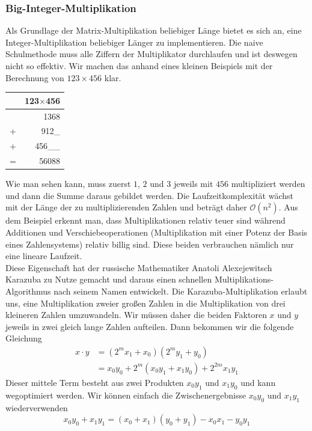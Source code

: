 \documentclass[course=erap]{aspdoc}
\begin{document}
\subsubsection{Big-Integer-Multiplikation}
Als Grundlage der Matrix-Multiplikation beliebiger Länge bietet es sich an, eine Integer-Multiplikation beliebiger Länger zu implementieren. Die naive Schulmethode muss alle Ziffern der Multiplikator durchlaufen und ist deswegen nicht so effektiv. Wir machen das anhand eines kleinen Beispiels mit der Berechnung von $123\times456$ klar.  
\begin{center}
    \begin{tabular}{lr}
    &123$\times$456 \\
    \hline
    &1368 \\
    +&912\_ \\
    +&456\_\_ \\
    \hline
    =&56088 \\
    \end{tabular}
\end{center}
Wie man sehen kann, muss zuerst $1$, $2$ und $3$ jeweils mit $456$ multipliziert werden und dann die Summe daraus gebildet werden. Die Laufzeitkomplexität wächst mit der Länge der zu multiplizierenden Zahlen und beträgt daher $\mathcal{O}(n^2)$. Aus dem Beispiel erkennt man, dass Multiplikationen relativ \glqq teuer\grqq{} sind während Additionen und Verschiebeoperationen (Multiplikation mit einer Potenz der Basis eines Zahlensystems) relativ \glqq billig\grqq{} sind. Diese beiden verbrauchen nämlich nur eine lineare Laufzeit. 
\\Diese Eigenschaft hat der russische Mathematiker Anatoli Alexejewitsch Karazuba\cite{karatsuba} zu Nutze gemacht und daraus einen schnellen Multiplikations-Algorithmus nach seinem Namen entwickelt\cite{karatsubaArtikel}. Die Karazuba-Multiplikation erlaubt uns, eine Multiplikation zweier großen Zahlen in die Multiplikation von drei kleineren Zahlen umzuwandeln. Wir müssen daher die beiden Faktoren $x$ und $y$ jeweils in zwei gleich lange Zahlen aufteilen. Dann bekommen wir die folgende Gleichung
\begin{align*}
    x \cdot y &= (2^mx_1 + x_0)(2^my_1 + y_0) \\
              &= x_0y_0 + 2^m(x_0y_1 + x_1y_0) + 2^{2m}x_1y_1
\end{align*}
Dieser mittele Term besteht aus zwei Produkten $x_0y_1$ und $x_1y_0$ und kann wegoptimiert werden. Wir können einfach die Zwischenergebnisse $x_0y_0$ und $x_1y_1$ wiederverwenden
\[ x_0y_0 + x_1y_1 = (x_0+x_1)(y_0+y_1) - x_0x_1 - y_0y_1 \]
\end{document}
